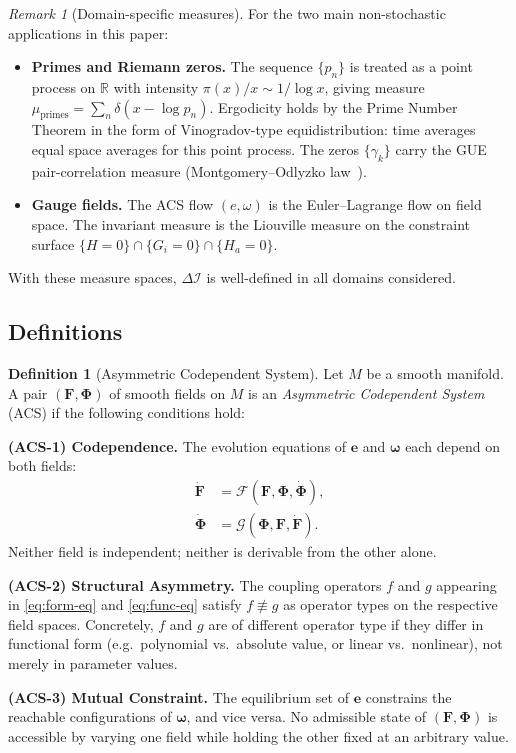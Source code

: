 \documentclass[11pt,a4paper]{article}
\theoremstyle{plain}
\theoremstyle{definition}
\newtheorem{definition}[theorem]{Definition}
\theoremstyle{remark}
\newtheorem{remark}[theorem]{Remark}
\newcommand{\DI}{\Delta\mathcal{I}}
\newcommand{\FormF}{\mathbf{F}}
\newcommand{\FuncF}{\boldsymbol{\Phi}}
\renewcommand{\Form}{\mathbf{e}}
\providecommand{\Func}{\boldsymbol{\omega}}
\begin{document}
\begin{remark}[Domain-specific measures]
For the two main non-stochastic applications in this paper:
\begin{itemize}[noitemsep]
  \item \textbf{Primes and Riemann zeros.}  The sequence $\{p_n\}$ is treated
    as a point process on $\mathbb{R}$ with intensity $\pi(x)/x \sim 1/\log x$,
    giving measure $\mu_{\mathrm{primes}} = \sum_n \delta(x - \log p_n)$.
    Ergodicity holds by the Prime Number Theorem in the form of Vinogradov-type
    equidistribution: time averages equal space averages for this point process.
    The zeros $\{\gamma_k\}$ carry the GUE pair-correlation measure
    (Montgomery--Odlyzko law~\cite{Montgomery1973,Odlyzko1987}).
  \item \textbf{Gauge fields.}  The ACS flow $(e, \omega)$ is the
    Euler--Lagrange flow on field space.  The invariant measure is the
    Liouville measure on the constraint surface
    $\{H = 0\} \cap \{G_i = 0\} \cap \{H_a = 0\}$.
\end{itemize}
With these measure spaces, $\DI$ is well-defined in all domains considered.
\end{remark}

\subsection{Definitions}

\begin{definition}[Asymmetric Codependent System]\label{def:acs}
Let $M$ be a smooth manifold.  A pair $(\FormF, \FuncF)$ of smooth fields on 
$M$ is an \emph{Asymmetric Codependent System} (ACS) if the following 
conditions hold:

\medskip
\noindent\textbf{(ACS-1) Codependence.}
The evolution equations of $\Form$ and $\Func$ each depend on both fields:
\begin{align}
\dot{\FormF} &= \mathcal{F}(\FormF, \FuncF, \dot{\FuncF}), \label{eq:form-eq}\\
\dot{\FuncF} &= \mathcal{G}(\FuncF, \FormF, \dot{\FormF}). \label{eq:func-eq}
\end{align}
Neither field is independent; neither is derivable from the other alone.

\medskip
\noindent\textbf{(ACS-2) Structural Asymmetry.}
The coupling operators $f$ and $g$ appearing in \eqref{eq:form-eq} and 
\eqref{eq:func-eq} satisfy $f \not\equiv g$ as operator types on the 
respective field spaces.  Concretely, $f$ and $g$ are of different
operator type if they differ in functional form (e.g.\ polynomial vs.\
absolute value, or linear vs.\ nonlinear), not merely in parameter values.

\medskip
\noindent\textbf{(ACS-3) Mutual Constraint.}
The equilibrium set of $\Form$ constrains the reachable configurations of 
$\Func$, and vice versa.  No admissible state of $(\FormF, \FuncF)$ is 
accessible by varying one field while holding the other fixed at an 
arbitrary value.
\end{definition}
\end{document}
